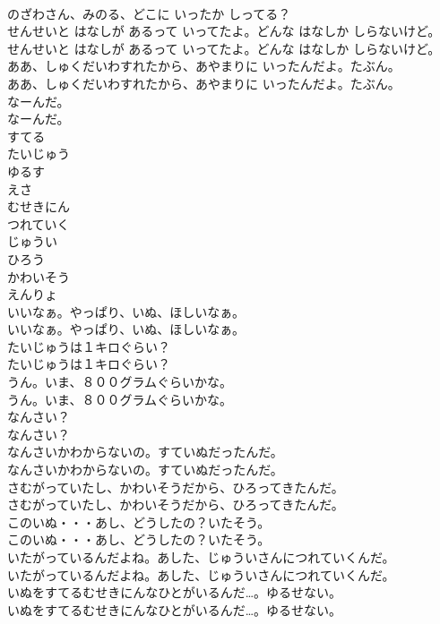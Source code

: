 \documentclass[8pt]{extreport}
\begin{document}
\begin{CJK}{UTF8}{min}
\\	のざわさん、みのる、どこに いったか しってる？
\\	せんせいと はなしが あるって いってたよ。どんな はなしか しらないけど。
\\	せんせいと はなしが あるって いってたよ。どんな はなしか しらないけど。
\\	ああ、しゅくだいわすれたから、あやまりに いったんだよ。たぶん。
\\	ああ、しゅくだいわすれたから、あやまりに いったんだよ。たぶん。
\\	なーんだ。
\\	なーんだ。
\\	すてる
\\	たいじゅう
\\	ゆるす
\\	えさ
\\	むせきにん
\\	つれていく
\\	じゅうい
\\	ひろう
\\	かわいそう
\\	えんりょ
\\	いいなぁ。やっぱり、いぬ、ほしいなぁ。
\\	いいなぁ。やっぱり、いぬ、ほしいなぁ。
\\	たいじゅうは１キロぐらい？
\\	たいじゅうは１キロぐらい？
\\	うん。いま、８００グラムぐらいかな。
\\	うん。いま、８００グラムぐらいかな。
\\	なんさい？
\\	なんさい？
\\	なんさいかわからないの。すていぬだったんだ。
\\	なんさいかわからないの。すていぬだったんだ。
\\	さむがっていたし、かわいそうだから、ひろってきたんだ。
\\	さむがっていたし、かわいそうだから、ひろってきたんだ。
\\	このいぬ・・・あし、どうしたの？いたそう。
\\	このいぬ・・・あし、どうしたの？いたそう。
\\	いたがっているんだよね。あした、じゅういさんにつれていくんだ。
\\	いたがっているんだよね。あした、じゅういさんにつれていくんだ。
\\	いぬをすてるむせきにんなひとがいるんだ…。ゆるせない。
\\	いぬをすてるむせきにんなひとがいるんだ…。ゆるせない。

\end{CJK}
\end{document}
